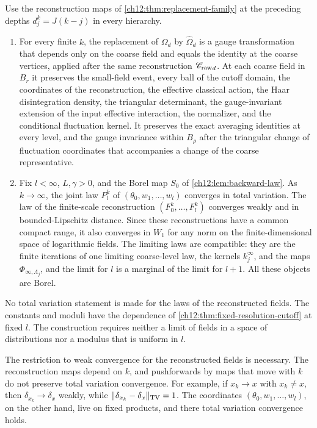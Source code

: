 \begin{theorem}\label{ch12:thm:representative-prefixes}
Use the reconstruction maps of \cref{ch12:thm:replacement-family} at the preceding depths $d_j^k=J(k-j)$ in every hierarchy.
\begin{enumerate}
\item For every finite $k$, the replacement of $\Omega_d$ by $\widehat\Omega_d$ is a gauge transformation that depends only on the coarse field and equals the identity at the coarse vertices, applied after the same reconstruction ${\mathscr C_{\mathrm{raw}}}_d$. At each coarse field in $B_r$ it preserves the small-field event, every ball of the cutoff domain, the coordinates of the reconstruction, the effective classical action, the Haar disintegration density, the triangular determinant, the gauge-invariant extension of the input effective interaction, the normalizer, and the conditional fluctuation kernel. It preserves the exact averaging identities at every level, and the gauge invariance within $B_\rho$ after the triangular change of fluctuation coordinates that accompanies a change of the coarse representative.
\item Fix $l<\infty$, $L,\gamma>0$, and the Borel map $S_0$ of \cref{ch12:lem:backward-law}. As $k\to\infty$, the joint law $P_l^k$ of $(\theta_0,w_1,\ldots,w_l)$ converges in total variation. The law of the finite-scale reconstruction $(F_0^k,\ldots,F_l^k)$ converges weakly and in bounded-Lipschitz distance. Since these reconstructions have a common compact range, it also converges in $W_1$ for any norm on the finite-dimensional space of logarithmic fields. The limiting laws are compatible: they are the finite iterations of one limiting coarse-level law, the kernels $k_j^\infty$, and the maps $\Phi_{\infty,\Lambda_j}$, and the limit for $l$ is a marginal of the limit for $l+1$. All these objects are Borel.
\end{enumerate}
No total variation statement is made for the laws of the reconstructed fields. The constants and moduli have the dependence of \cref{ch12:thm:fixed-resolution-cutoff} at fixed $l$. The construction requires neither a limit of fields in a space of distributions nor a modulus that is uniform in $l$.
\end{theorem}

\begin{remark}
The restriction to weak convergence for the reconstructed fields is necessary. The reconstruction maps depend on $k$, and pushforwards by maps that move with $k$ do not preserve total variation convergence. For example, if $x_k\to x$ with $x_k\ne x$, then $\delta_{x_k}\to\delta_x$ weakly, while $\lVert \delta_{x_k}-\delta_x\rVert_{\operatorname{TV}}=1$. The coordinates $(\theta_0,w_1,\ldots,w_l)$, on the other hand, live on fixed products, and there total variation convergence holds.
\end{remark}

